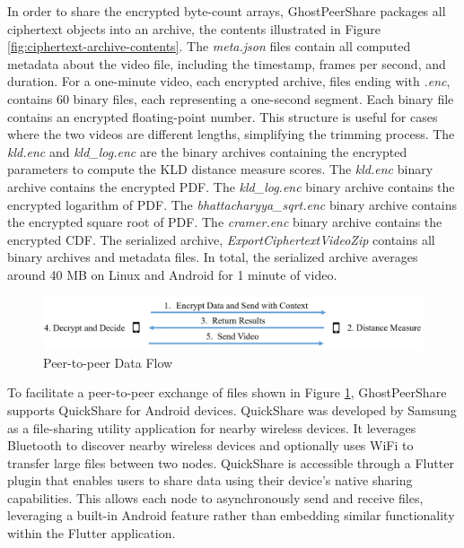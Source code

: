 In order to share the encrypted byte-count arrays, GhostPeerShare packages all ciphertext objects into an archive, the contents illustrated in Figure \ref{fig:ciphertext-archive-contents}. The \textit{meta.json} files contain all computed metadata about the video file, including the timestamp, frames per second, and duration. For a one-minute video, each encrypted archive, files ending with \textit{.enc}, contains 60 binary files, each representing a one-second segment. Each binary file contains an encrypted floating-point number. This structure is useful for cases where the two videos are different lengths, simplifying the trimming process. The \textit{kld.enc} and \textit{kld\_log.enc} are the binary archives containing the encrypted parameters to compute the KLD distance measure scores. The \textit{kld.enc} binary archive contains the encrypted PDF. The \textit{kld\_log.enc} binary archive contains the encrypted logarithm of PDF. The \textit{bhattacharyya\_sqrt.enc} binary archive contains the encrypted square root of PDF. The \textit{cramer.enc} binary archive contains the encrypted CDF. The serialized archive, \textit{ExportCiphertextVideoZip} contains all binary archives and metadata files. In total, the serialized archive averages around 40 MB on Linux and Android for 1 minute of video.

\begin{figure}[t]
    \centering
    \includegraphics[width=\textwidth]{4 Design/4.3 Peer-to-Peer.png}
    \caption{Peer-to-peer Data Flow}
    \label{fig:peer-to-peer-data-flow}
\end{figure}

To facilitate a peer-to-peer exchange of files shown in Figure \ref{fig:peer-to-peer-data-flow}, GhostPeerShare supports QuickShare \cite{samsung_quick_2020} for Android devices. QuickShare \cite{samsung_quick_2020} was developed by Samsung as a file-sharing utility application for nearby wireless devices. It leverages Bluetooth to discover nearby wireless devices and optionally uses WiFi to transfer large files between two nodes. QuickShare is accessible through a Flutter plugin that enables users to share data using their device’s native sharing capabilities. This allows each node to asynchronously send and receive files, leveraging a built-in Android feature rather than embedding similar functionality within the Flutter application.

